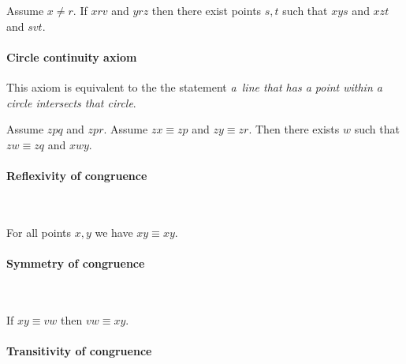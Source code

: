 \documentclass[10pt,a4paper,parskip=half,numbers=endperiod,headings=standardclasses,parskip]{scrbook}
\newcommand{\Cong}[4]{#1 #2 \equiv #3 #4}
\newcommand{\Betw}[3]{#1 #2 #3}
\begin{document}
  \begin{forthel}
    \begin{axiom}[A10]
      Assume $x \neq r$.
      If $\Betw{x}{r}{v}$ and $\Betw{y}{r}{z}$
      then there exist points $s,t$ such that
      $\Betw{x}{y}{s}$ and $\Betw{x}{z}{t}$ and $\Betw{s}{v}{t}$.
    \end{axiom}
  \end{forthel}


  \paragraph{Circle continuity axiom}
  This axiom is equivalent to the the statement
  \textit{a~line that has a point within a circle intersects that circle}.

  \begin{forthel}
    \begin{axiom}[CA]
      Assume $\Betw{z}{p}{q}$ and $\Betw{z}{p}{r}$.
      Assume $\Cong{z}{x}{z}{p}$ and $\Cong{z}{y}{z}{r}$.
      Then there exists $w$ such that $\Cong{z}{w}{z}{q}$ and $\Betw{x}{w}{y}$.
    \end{axiom}
  \end{forthel}







  \paragraph{Reflexivity of congruence}\

  \begin{forthel}
    \begin{lemma} %
      For all points $x, y$ we have $\Cong{x}{y}{x}{y}$.
    \end{lemma}
  \end{forthel}


  \paragraph{Symmetry of congruence}\

  \begin{forthel}
    \begin{lemma} %
      If $\Cong{x}{y}{v}{w}$
      then $\Cong{v}{w}{x}{y}$.
    \end{lemma}
  \end{forthel}


  \paragraph{Transitivity of congruence}\
\end{document}
